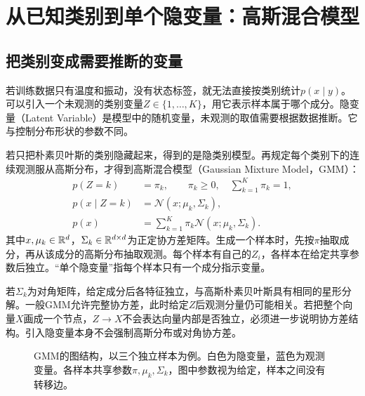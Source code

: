 \section{从已知类别到单个隐变量：高斯混合模型}
\subsection{把类别变成需要推断的变量}
若训练数据只有温度和振动，没有状态标签，就无法直接按类别统计$p(x\mid y)$。可以引入一个未观测的类别变量$Z\in\{1,\ldots,K\}$，用它表示样本属于哪个成分。隐变量（Latent Variable）是模型中的随机变量，未观测的取值需要根据数据推断。它与控制分布形状的参数不同。

若只把朴素贝叶斯的类别隐藏起来，得到的是隐类别模型。再规定每个类别下的连续观测服从高斯分布，才得到高斯混合模型（Gaussian Mixture Model，GMM）：
\begin{align}
 p(Z=k)&=\pi_k,\qquad \pi_k\geq0,\quad\sum_{k=1}^K\pi_k=1,\\
 p(x\mid Z=k)&=\mathcal N(x;\mu_k,\Sigma_k),\\
 p(x)&=\sum_{k=1}^K\pi_k\mathcal N(x;\mu_k,\Sigma_k).
 \label{eq:bayes-gmm-marginal}
\end{align}
其中$x,\mu_k\in\mathbb{R}^d$，$\Sigma_k\in\mathbb{R}^{d\times d}$为正定协方差矩阵。生成一个样本时，先按$\pi$抽取成分，再从该成分的高斯分布抽取观测。每个样本有自己的$Z_i$，各样本在给定共享参数后独立。“单个隐变量”指每个样本只有一个成分指示变量。

若$\Sigma_k$为对角矩阵，给定成分后各特征独立，与高斯朴素贝叶斯具有相同的星形分解。一般GMM允许完整协方差，此时给定$Z$后观测分量仍可能相关。若把整个向量$X$画成一个节点，$Z\to X$不会表达向量内部是否独立，必须进一步说明协方差结构。引入隐变量本身不会强制高斯分布或对角协方差。

\begin{figure}[htbp]
\centering
{}
\caption{GMM的图结构，以三个独立样本为例。白色为隐变量，蓝色为观测变量。各样本共享参数$\pi,\mu_k,\Sigma_k$，图中参数视为给定，样本之间没有转移边。}
\label{fig:bayes-gmm-structure}
\end{figure}

